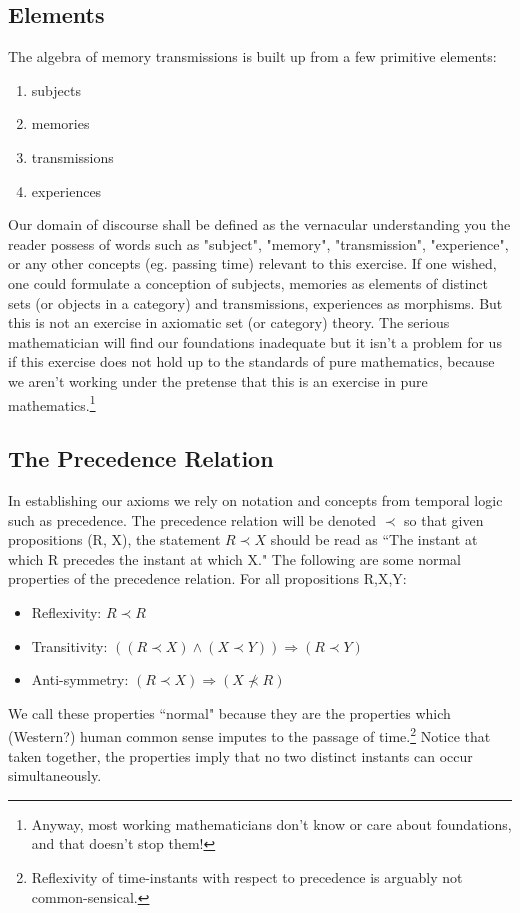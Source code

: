 \documentclass{article}
\begin{document}
\subsection*{Elements}
The algebra of memory transmissions is built up from a few primitive elements: 
\begin{enumerate}
    \item subjects
    \item memories
    \item transmissions
    \item experiences
\end{enumerate}Our domain of discourse shall be defined as the vernacular understanding you the reader possess of words such as "subject", "memory", "transmission", "experience", or any other concepts (eg. passing time) relevant to this exercise. If one wished, one could formulate a conception of subjects, memories as elements of distinct sets (or objects in a category) and transmissions, experiences as morphisms. But this is not an exercise in axiomatic set (or category) theory. The serious mathematician will find our foundations inadequate but it isn't a problem for us if this exercise does not hold up to the standards of pure mathematics, because we aren't working under the pretense that this is an exercise in pure mathematics.\footnote{Anyway, most working mathematicians don't know or care about foundations, and that doesn't stop them!}

\subsection*{The Precedence Relation}
In establishing our axioms we rely on notation and concepts from temporal logic such as precedence. The precedence relation will be denoted $\prec$ so that given propositions (R, X), the statement $R \prec X$ should be read as ``The instant at which R precedes the instant at which X." The following are some normal properties of the precedence relation. For all propositions R,X,Y:

\begin{itemize}
    \item Reflexivity: $R \prec R$ 
    \item Transitivity: $((R \prec X) \land (X \prec Y)) \Rightarrow (R \prec Y)$
    \item Anti-symmetry: $(R \prec X) \Rightarrow (X \nprec R)$
\end{itemize}
We call these properties ``normal" because they are the properties which (Western?) human common sense imputes to the passage of time.\footnote{Reflexivity of time-instants with respect to precedence is arguably not common-sensical.} Notice that taken together, the properties imply that no two distinct instants can occur simultaneously.
\end{document}
